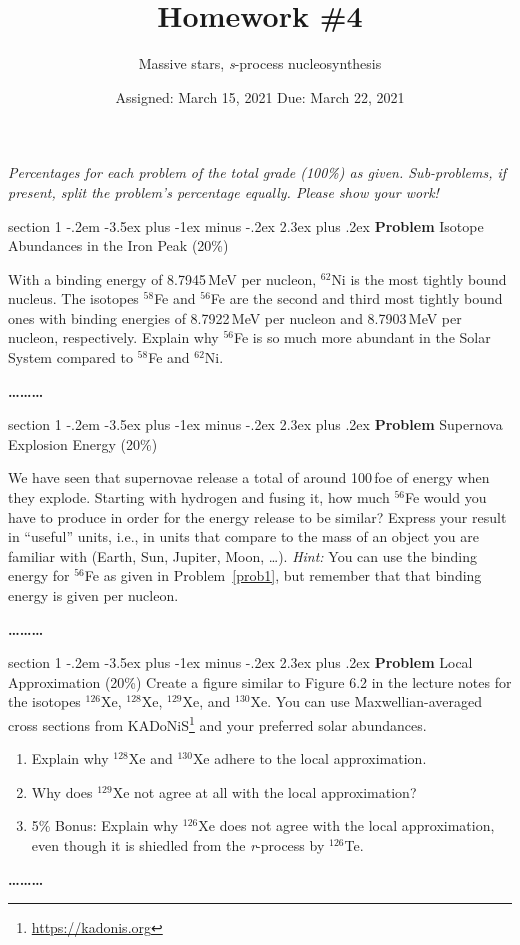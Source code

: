 \documentclass[letterpaper,12pt,twoside=false,DIV=11]{scrartcl}
\makeatletter
\newcommand{\topic}{\author}
\newenvironment{problem}{\@startsection
    {section}
    {1}
    {-.2em}
    {-3.5ex plus -1ex minus -.2ex}
    {2.3ex plus .2ex}
    {
        \pagebreak[3] %
        \noindent\sffamily\bfseries Problem
    }
}
{
    \begin{center}\large\bfseries\ldots\ldots\ldots\end{center}
}
\providecommand{\ex}[1]{\ensuremath{^{#1}}}
\makeatother
\begin{document}
\title{Homework \#4}
\topic{Massive stars, \emph{s}-process nucleosynthesis}
\date{Assigned: March 15, 2021 \qquad Due: March 22, 2021}

\maketitle
\thispagestyle{fancy}

\noindent\emph{Percentages for each problem of the total grade (100\%) as given. Sub-problems, if present, split the problem's percentage equally. Please show your work!}

\begin{problem}{Isotope Abundances in the Iron Peak (20\%)} \label{prob1}

With a binding energy of 8.7945\,MeV per nucleon, \ex{62}Ni is the most tightly bound nucleus. The isotopes \ex{58}Fe and \ex{56}Fe are the second and third most tightly bound ones with binding energies of 8.7922\,MeV per nucleon and 8.7903\,MeV per nucleon, respectively. Explain why \ex{56}Fe is so much more abundant in the Solar System compared to \ex{58}Fe and \ex{62}Ni.

\end{problem}

\begin{problem}{Supernova Explosion Energy (20\%)}

We have seen that supernovae release a total of around 100\,foe of energy when they explode. Starting with hydrogen and fusing it, how much \ex{56}Fe would you have to produce in order for the energy release to be similar? Express your result in ``useful'' units, i.e., in units that compare to the mass of an object you are familiar with (Earth, Sun, Jupiter, Moon, \dots). \emph{Hint:} You can use the binding energy for \ex{56}Fe as given in Problem~\ref{prob1}, but remember that that binding energy is given per nucleon.

\end{problem}

\begin{problem}{Local Approximation (20\%)}
Create a figure similar to Figure 6.2 in the lecture notes for the isotopes \ex{126}Xe, \ex{128}Xe, \ex{129}Xe, and \ex{130}Xe. You can use Maxwellian-averaged cross sections from KADoNiS\footnote{\url{https://kadonis.org}} and your preferred solar abundances.
\begin{enumerate}
    \item Explain why \ex{128}Xe and \ex{130}Xe adhere to the local approximation.
    \item Why does \ex{129}Xe not agree at all with the local approximation?
    \item 5\% Bonus: Explain why \ex{126}Xe does not agree with the local approximation, even though it is shiedled from the \textit{r}-process by \ex{126}Te.
\end{enumerate}
\end{problem}
\end{document}
